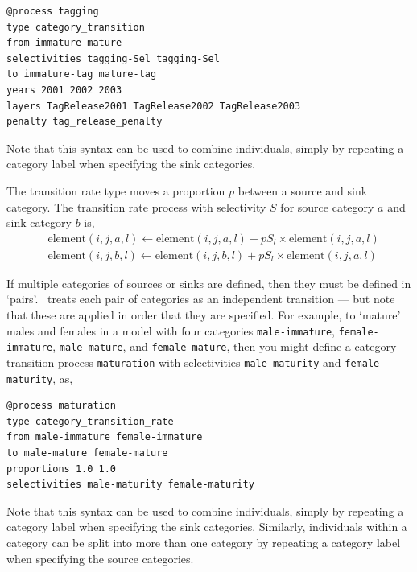 {\small{\begin{verbatim}
@process tagging
type category_transition
from immature mature
selectivities tagging-Sel tagging-Sel
to immature-tag mature-tag
years 2001 2002 2003
layers TagRelease2001 TagRelease2002 TagRelease2003
penalty tag_release_penalty
\end{verbatim}}}

Note that this syntax can be used to combine individuals, simply by repeating a category label when specifying the sink categories.

The transition rate type moves a proportion $p$ between a source and sink category. The transition rate process with selectivity $S$ for source category $a$ and sink category $b$ is,
\begin{equation}\begin{split}
  & \text{element}(i,j,a,l) \leftarrow \text{element}(i,j,a,l) - pS_l \times \text{element}(i,j,a,l) \\
  & \text{element}(i,j,b,l) \leftarrow \text{element}(i,j,b,l) + pS_l \times \text{element}(i,j,a,l)
\end{split}\end{equation}

If multiple categories of sources or sinks are defined, then they must be defined in `pairs'. \SPM\ treats each pair of categories as an independent transition --- but note that these are applied in order that they are specified. For example, to `mature' males and females in a model with four categories \texttt{male-immature}, \texttt{female-immature}, \texttt{male-mature}, and \texttt{female-mature}, then you might define a category transition process \texttt{maturation} with selectivities \texttt{male-maturity} and \texttt{female-maturity}, as,

{\small{\begin{verbatim}
@process maturation
type category_transition_rate
from male-immature female-immature
to male-mature female-mature
proportions 1.0 1.0
selectivities male-maturity female-maturity
\end{verbatim}}}

Note that this syntax can be used to combine individuals, simply by repeating a category label when specifying the sink categories. Similarly, individuals within a category can be split into more than one category by repeating a category label when specifying the source categories.

\subsection{\label{sec:movement-processes}}

